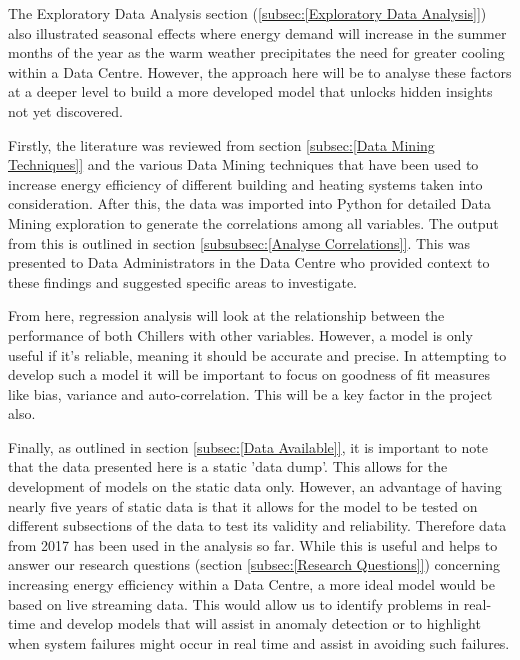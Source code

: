 \documentclass[12pt]{scrartcl}
\begin{document}
The Exploratory Data Analysis section (\ref{subsec:[Exploratory Data Analysis]}) also illustrated seasonal effects where energy demand will increase in the summer months of the year as the warm weather precipitates the need for greater cooling within a Data Centre. However, the approach here will be to analyse these factors at a deeper level to build a more developed  model that unlocks hidden insights not yet discovered.

Firstly, the literature was reviewed from section \ref{subsec:[Data Mining Techniques]} and the various Data Mining techniques that have been used to increase energy efficiency of different building and heating systems taken into consideration. After this, the data was imported into Python for detailed Data Mining exploration to generate the correlations among all variables. The output from this is outlined in section \ref{subsubsec:[Analyse Correlations]}. This was presented to Data Administrators in the Data Centre who provided context to these findings and suggested specific areas to investigate.   %

From here, regression analysis will look at the relationship between the performance of both Chillers with other variables. However, a model is only useful if it's reliable, meaning it should be accurate and precise. In attempting to develop such a model it will be important to focus on goodness of fit measures like bias, variance and auto-correlation. This will be a key factor in the project also.

Finally, as outlined in section \ref{subsec:[Data Available]}, it is important to note that the data presented here is a static 'data dump'. This allows for the development of models on the static data only. However, an advantage of having nearly five years of static data is that it allows for the model to be tested on different subsections of the data to test its validity and reliability.  Therefore data from 2017 has been used in the analysis so far. While this is useful and helps to answer our research questions (section \ref{subsec:[Research Questions]}) concerning increasing energy efficiency within a Data Centre, a more ideal model would be based on live streaming data. This would allow us to identify problems in real-time and develop models that will assist in anomaly detection or to highlight when system failures might occur in real time and assist in avoiding such failures. 
\end{document}
